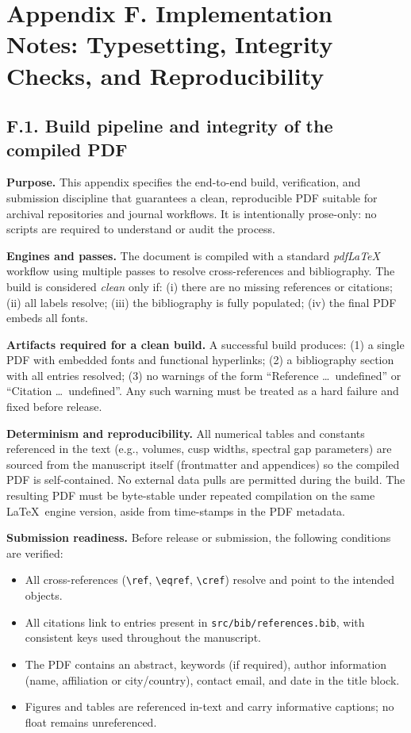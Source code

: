 \section*{Appendix F. Implementation Notes: Typesetting, Integrity Checks, and Reproducibility}

\subsection*{F.1. Build pipeline and integrity of the compiled PDF}

\noindent \textbf{Purpose.}
This appendix specifies the end-to-end build, verification, and submission discipline that guarantees a clean, reproducible PDF suitable for archival repositories and journal workflows. It is intentionally prose-only: no scripts are required to understand or audit the process.

\medskip
\noindent \textbf{Engines and passes.}
The document is compiled with a standard \emph{pdf\LaTeX} workflow using multiple passes to resolve cross-references and bibliography. The build is considered \emph{clean} only if: (i) there are no missing references or citations; (ii) all labels resolve; (iii) the bibliography is fully populated; (iv) the final PDF embeds all fonts.

\medskip
\noindent \textbf{Artifacts required for a clean build.}
A successful build produces: (1) a single PDF with embedded fonts and functional hyperlinks; (2) a bibliography section with all entries resolved; (3) no warnings of the form “Reference \dots\ undefined” or “Citation \dots\ undefined”. Any such warning must be treated as a hard failure and fixed before release.

\medskip
\noindent \textbf{Determinism and reproducibility.}
All numerical tables and constants referenced in the text (e.g., volumes, cusp widths, spectral gap parameters) are sourced from the manuscript itself (frontmatter and appendices) so the compiled PDF is self-contained. No external data pulls are permitted during the build. The resulting PDF must be byte-stable under repeated compilation on the same \LaTeX\ engine version, aside from time-stamps in the PDF metadata.

\medskip
\noindent \textbf{Submission readiness.}
Before release or submission, the following conditions are verified:
\begin{itemize}
  \item All cross-references (\verb|\ref|, \verb|\eqref|, \verb|\cref|) resolve and point to the intended objects.
  \item All citations link to entries present in \texttt{src/bib/references.bib}, with consistent keys used throughout the manuscript.
  \item The PDF contains an abstract, keywords (if required), author information (name, affiliation or city/country), contact email, and date in the title block.
  \item Figures and tables are referenced in-text and carry informative captions; no float remains unreferenced.
\end{itemize}

